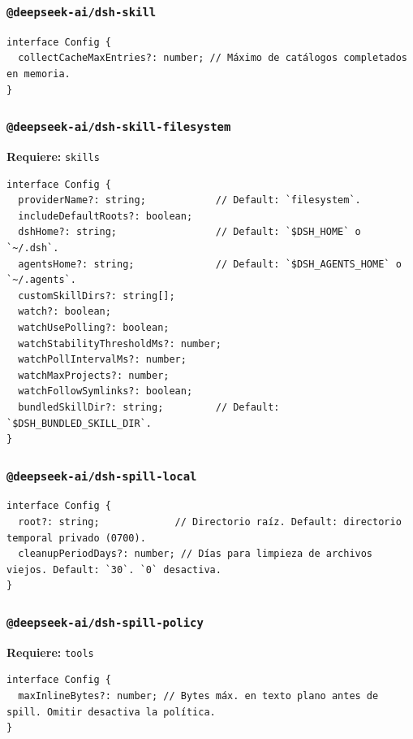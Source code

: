 \documentclass[11pt,a4paper]{article}
\begin{document}
\subsubsection*{\texttt{@deepseek-ai/dsh-skill}}


\begin{lstlisting}
interface Config {
  collectCacheMaxEntries?: number; // Máximo de catálogos completados en memoria.
}
\end{lstlisting}


\subsubsection*{\texttt{@deepseek-ai/dsh-skill-filesystem}}


\textbf{Requiere:} \texttt{skills}


\begin{lstlisting}
interface Config {
  providerName?: string;            // Default: `filesystem`.
  includeDefaultRoots?: boolean;
  dshHome?: string;                 // Default: `$DSH_HOME` o `~/.dsh`.
  agentsHome?: string;              // Default: `$DSH_AGENTS_HOME` o `~/.agents`.
  customSkillDirs?: string[];
  watch?: boolean;
  watchUsePolling?: boolean;
  watchStabilityThresholdMs?: number;
  watchPollIntervalMs?: number;
  watchMaxProjects?: number;
  watchFollowSymlinks?: boolean;
  bundledSkillDir?: string;         // Default: `$DSH_BUNDLED_SKILL_DIR`.
}
\end{lstlisting}


\subsubsection*{\texttt{@deepseek-ai/dsh-spill-local}}


\begin{lstlisting}
interface Config {
  root?: string;             // Directorio raíz. Default: directorio temporal privado (0700).
  cleanupPeriodDays?: number; // Días para limpieza de archivos viejos. Default: `30`. `0` desactiva.
}
\end{lstlisting}


\subsubsection*{\texttt{@deepseek-ai/dsh-spill-policy}}


\textbf{Requiere:} \texttt{tools}


\begin{lstlisting}
interface Config {
  maxInlineBytes?: number; // Bytes máx. en texto plano antes de spill. Omitir desactiva la política.
}
\end{lstlisting}
\end{document}
